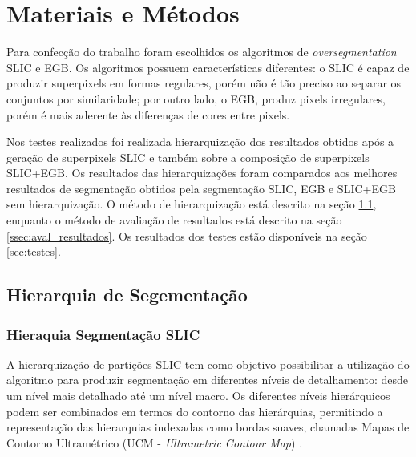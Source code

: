 \begin{document}

\section{Materiais e Métodos} \label{sec:mat_metodos}

Para confecção do trabalho foram escolhidos os algoritmos de \textit{oversegmentation} SLIC e EGB. Os algoritmos possuem características diferentes: o SLIC é capaz de produzir superpixels em formas regulares, porém não é tão preciso ao separar os conjuntos por similaridade; por outro lado, o EGB, produz pixels irregulares, porém é mais aderente às diferenças de cores entre pixels.

Nos testes realizados foi realizada hierarquização dos resultados obtidos após a geração de superpixels SLIC e também sobre a composição de superpixels SLIC+EGB. Os resultados das hierarquizações foram comparados aos melhores resultados de segmentação obtidos pela segmentação SLIC, EGB e SLIC+EGB sem hierarquização. O método de hierarquização está descrito na seção \ref{ssec:hierquia_segm}, enquanto o método de avaliação de resultados está descrito na seção \ref{ssec:aval_resultados}. Os resultados dos testes estão disponíveis na seção \ref{sec:testes}.


\subsection{Hierarquia de Segementação} \label{ssec:hierquia_segm}


\subsubsection{Hieraquia Segmentação SLIC} \label{sssec:hierq_segm_slic}

A hierarquização de partições SLIC tem como objetivo possibilitar a utilização do algoritmo para produzir segmentação em diferentes níveis de detalhamento: desde um nível mais detalhado até um nível macro. Os diferentes níveis hierárquicos podem ser combinados em termos do contorno das hierárquias, permitindo a representação das hierarquias indexadas como bordas suaves, chamadas Mapas de Contorno Ultramétrico (UCM - \textit{Ultrametric Contour Map}) \cite{ULTRAMETRIC}.
\end{document}
